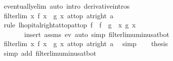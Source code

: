 \begin{isabellebody}
\ eventually{\isacharunderscore}{\kern0pt}elim\ {\isacharparenleft}{\kern0pt}auto\ intro{\isacharcolon}{\kern0pt}\ derivative{\isacharunderscore}{\kern0pt}intros{\isacharparenright}{\kern0pt}\isanewline
\ \ \isamarkupfalse%
\ {\isachardoublequoteopen}filterlim\ {\isacharparenleft}{\kern0pt}{\isasymlambda}x{\isachardot}{\kern0pt}\ f\ x\ {\isacharslash}{\kern0pt}\ {\isacharparenleft}{\kern0pt}{\isacharminus}{\kern0pt}g\ x{\isacharparenright}{\kern0pt}{\isacharparenright}{\kern0pt}\ at{\isacharunderscore}{\kern0pt}top\ {\isacharparenleft}{\kern0pt}at{\isacharunderscore}{\kern0pt}right\ a{\isacharparenright}{\kern0pt}{\isachardoublequoteclose}\isanewline
\ \ \ \ \isamarkupfalse%
\ {\isacharparenleft}{\kern0pt}rule\ lhopital{\isacharunderscore}{\kern0pt}right{\isacharunderscore}{\kern0pt}at{\isacharunderscore}{\kern0pt}top{\isacharunderscore}{\kern0pt}at{\isacharunderscore}{\kern0pt}top{\isacharbrackleft}{\kern0pt}\ f{\isacharprime}{\kern0pt}\ {\isacharequal}{\kern0pt}\ f{\isacharprime}{\kern0pt}\ \ g{\isacharprime}{\kern0pt}\ {\isacharequal}{\kern0pt}\ {\isachardoublequoteopen}{\isasymlambda}x{\isachardot}{\kern0pt}\ {\isacharminus}{\kern0pt}g{\isacharprime}{\kern0pt}\ x{\isachardoublequoteclose}{\isacharbrackright}{\kern0pt}{\isacharparenright}{\kern0pt}\isanewline
\ \ \ \ \ \ \ {\isacharparenleft}{\kern0pt}insert\ assms\ ev{\isacharprime}{\kern0pt}{\isacharcomma}{\kern0pt}\ auto\ simp{\isacharcolon}{\kern0pt}\ filterlim{\isacharunderscore}{\kern0pt}uminus{\isacharunderscore}{\kern0pt}at{\isacharunderscore}{\kern0pt}bot{\isacharparenright}{\kern0pt}\isanewline
\ \ \isamarkupfalse%
\ {\isachardoublequoteopen}filterlim\ {\isacharparenleft}{\kern0pt}{\isasymlambda}x{\isachardot}{\kern0pt}\ {\isacharminus}{\kern0pt}{\isacharparenleft}{\kern0pt}f\ x\ {\isacharslash}{\kern0pt}\ g\ x{\isacharparenright}{\kern0pt}{\isacharparenright}{\kern0pt}\ at{\isacharunderscore}{\kern0pt}top\ {\isacharparenleft}{\kern0pt}at{\isacharunderscore}{\kern0pt}right\ a{\isacharparenright}{\kern0pt}{\isachardoublequoteclose}\ \isamarkupfalse%
\ simp\isanewline
\ \ \isamarkupfalse%
\ {\isacharquery}{\kern0pt}thesis\ \isamarkupfalse%
\ {\isacharparenleft}{\kern0pt}simp\ add{\isacharcolon}{\kern0pt}\ filterlim{\isacharunderscore}{\kern0pt}uminus{\isacharunderscore}{\kern0pt}at{\isacharunderscore}{\kern0pt}bot{\isacharparenright}{\kern0pt}\isanewline
{}\isamarkupfalse%
%
\endisatagproof
{\isafoldproof}%
%
\isadelimproof
\isanewline
%
\endisadelimproof

\end{isabellebody}
